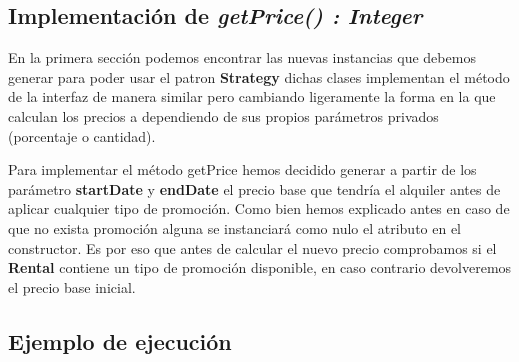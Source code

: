 \subsection{Implementación de \textit{getPrice() : Integer}}
\par
En la primera sección podemos encontrar las nuevas instancias que debemos generar para poder usar el patron \textbf{Strategy} dichas clases implementan el método de la interfaz
de manera similar pero cambiando ligeramente la forma en la que calculan los precios a dependiendo de sus propios parámetros privados (porcentaje o cantidad).\par
\vspace{0.15cm}
Para implementar el método getPrice hemos decidido generar a partir de los parámetro \textbf{startDate} y \textbf{endDate} el precio base que tendría el alquiler antes de aplicar 
cualquier tipo de promoción. Como bien hemos explicado antes en caso de que no exista promoción alguna se instanciará como nulo el atributo en el constructor. Es por eso que 
antes de calcular el nuevo precio comprobamos si el \textbf{Rental} contiene un tipo de promoción disponible, en caso contrario devolveremos el precio base inicial.

\newpage

\subsection{Ejemplo de ejecución}

